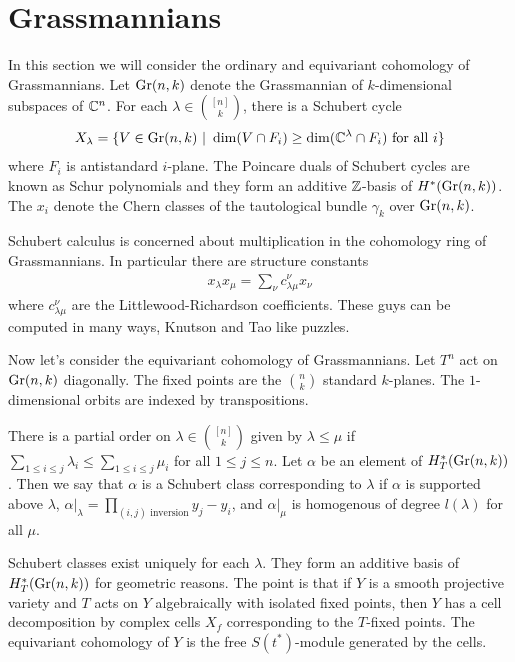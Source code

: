 \documentclass[12pt]{article}
\begin{document}
\section{Grassmannians}
In this section we will consider the ordinary and equivariant cohomology of Grassmannians.
Let $\operatorname{Gr}(n,k)$ denote the Grassmannian of $k$-dimensional subspaces of $\mathbb{C}^n$.
For each $\lambda \in \binom{[n]}{k}$, there is a Schubert cycle \begin{align*}
    X_\lambda = \{V\in\operatorname{Gr}(n,k)\ \vert \  \dim(V\cap F_i)\geq \dim(\mathbb{C}^\lambda \cap F_i) \text{ for all $i$}\}
\end{align*} where $F_i$ is antistandard $i$-plane. The Poincare duals of Schubert cycles are known as Schur polynomials and they form an additive $\mathbb{Z}$-basis of $H^*(\operatorname{Gr}(n,k))$.
The $x_i$ denote the Chern classes of the tautological bundle $\gamma_k$ over $\operatorname{Gr}(n,k)$.

Schubert calculus is concerned about multiplication in the cohomology ring of Grassmannians. In 
particular there are structure constants \begin{align*}
    x_\lambda x_\mu = \sum_\nu c_{\lambda\mu}^\nu x_\nu
\end{align*} where $c_{\lambda\mu}^\nu$ are the Littlewood-Richardson coefficients. These guys can 
be computed in many ways, Knutson and Tao like puzzles.

\hfill

Now let's consider the equivariant cohomology of Grassmannians. Let $T^n$ act on $\operatorname{Gr}(n,k)$ diagonally.
The fixed points are the $\binom{n}{k}$ standard $k$-planes. The $1$-dimensional orbits are indexed by transpositions.

\hfill

There is a partial order on $\lambda \in \binom{[n]}{k}$ given by $\lambda \leq \mu$ if 
$\sum_{1\leq i\leq j} \lambda_i \leq \sum_{1\leq i\leq j} \mu_i$ for all $1\leq j\leq n$. 
Let $\alpha$ be an element of $H^*_T(\operatorname{Gr}(n,k))$. Then we say that $\alpha$ is a Schubert class corresponding
to $\lambda$ if $\alpha$ is supported above $\lambda$, $\alpha\vert_\lambda = \prod_{(i,j)\text{ inversion}}y_j - y_i$, and 
$\alpha\vert_\mu$ is homogenous of degree $l(\lambda)$ for all $\mu$.

\hfill 

Schubert classes exist uniquely for each $\lambda$. They form an additive basis of $H^*_T(\operatorname{Gr}(n,k))$ for geometric reasons.
The point is that if $Y$ is a smooth projective variety and $T$ acts on $Y$ algebraically with isolated fixed points, then 
$Y$ has a cell decomposition by complex cells $X_f$ corresponding to the $T$-fixed points. The equivariant cohomology of $Y$ is
the free $S(t^*)$-module generated by the cells.
\end{document}
